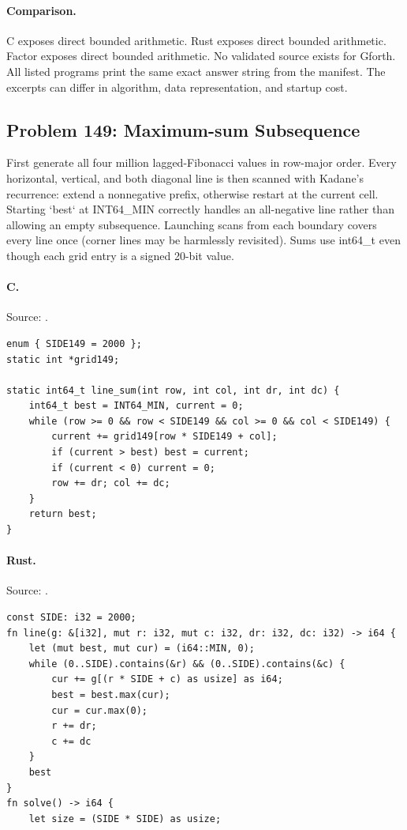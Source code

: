 \paragraph{Comparison.}
C exposes direct bounded arithmetic. Rust exposes direct bounded arithmetic. Factor exposes direct bounded arithmetic.
No validated source exists for Gforth.
All listed programs print the same exact answer string from the manifest. The excerpts can differ in algorithm, data representation, and startup cost.

\subsection{Problem 149: Maximum-sum Subsequence}
\label{walkthrough:p149}
First generate all four million lagged-Fibonacci values in row-major order. Every horizontal, vertical, and both diagonal line is then scanned with Kadane's recurrence: extend a nonnegative prefix, otherwise restart at the current cell. Starting `best` at INT64\_MIN correctly handles an all-negative line rather than allowing an empty subsequence. Launching scans from each boundary covers every line once (corner lines may be harmlessly revisited). Sums use int64\_t even though each grid entry is a signed 20-bit value.

\paragraph{C.} Source: .
\begin{lstlisting}
enum { SIDE149 = 2000 };
static int *grid149;

static int64_t line_sum(int row, int col, int dr, int dc) {
    int64_t best = INT64_MIN, current = 0;
    while (row >= 0 && row < SIDE149 && col >= 0 && col < SIDE149) {
        current += grid149[row * SIDE149 + col];
        if (current > best) best = current;
        if (current < 0) current = 0;
        row += dr; col += dc;
    }
    return best;
}
\end{lstlisting}

\paragraph{Rust.} Source: .
\begin{lstlisting}
const SIDE: i32 = 2000;
fn line(g: &[i32], mut r: i32, mut c: i32, dr: i32, dc: i32) -> i64 {
    let (mut best, mut cur) = (i64::MIN, 0);
    while (0..SIDE).contains(&r) && (0..SIDE).contains(&c) {
        cur += g[(r * SIDE + c) as usize] as i64;
        best = best.max(cur);
        cur = cur.max(0);
        r += dr;
        c += dc
    }
    best
}
fn solve() -> i64 {
    let size = (SIDE * SIDE) as usize;
\end{lstlisting}

